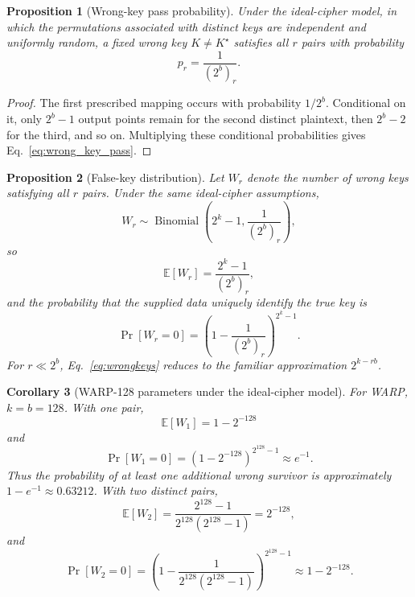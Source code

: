 \documentclass[pdflatex,sn-nature]{sn-jnl}
\newcommand{\E}{\mathbb{E}}
\newcommand{\Prb}{\Pr}
\theoremstyle{thmstyleone}
\newtheorem{proposition}{Proposition}
\newtheorem{corollary}[proposition]{Corollary}
\theoremstyle{thmstyletwo}
\begin{document}
\begin{proposition}[Wrong-key pass probability]
Under the ideal-cipher model, in which the permutations associated with distinct keys are independent and uniformly random, a fixed wrong key $K\neq K^\star$ satisfies all $r$ pairs with probability
\begin{equation}
    p_r=\frac{1}{(2^b)_r}.
    \label{eq:wrong_key_pass}
\end{equation}
\end{proposition}
\begin{proof}
The first prescribed mapping occurs with probability $1/2^b$.  Conditional on it, only $2^b-1$ output points remain for the second distinct plaintext, then $2^b-2$ for the third, and so on.  Multiplying these conditional probabilities gives Eq.~\eqref{eq:wrong_key_pass}.
\end{proof}

\begin{proposition}[False-key distribution]
Let $W_r$ denote the number of wrong keys satisfying all $r$ pairs.  Under the same ideal-cipher assumptions,
\begin{equation}
    W_r\sim\operatorname{Binomial}\!\left(2^k-1,\frac{1}{(2^b)_r}\right),
    \label{eq:falsekey_binomial}
\end{equation}
so
\begin{equation}
    \E[W_r]=\frac{2^k-1}{(2^b)_r},
    \label{eq:wrongkeys}
\end{equation}
and the probability that the supplied data uniquely identify the true key is
\begin{equation}
    \Prb[W_r=0]=
    \left(1-\frac{1}{(2^b)_r}\right)^{2^k-1}.
    \label{eq:unique_key_probability}
\end{equation}
For $r\ll2^b$, Eq.~\eqref{eq:wrongkeys} reduces to the familiar approximation $2^{k-rb}$.
\end{proposition}

\begin{corollary}[WARP-128 parameters under the ideal-cipher model]
For WARP, $k=b=128$.  With one pair,
\begin{equation}
    \E[W_1]=1-2^{-128}
\end{equation}
and
\begin{equation}
    \Prb[W_1=0]=
    \left(1-2^{-128}\right)^{2^{128}-1}\approx e^{-1}.
\end{equation}
Thus the probability of at least one additional wrong survivor is approximately $1-e^{-1}\approx0.63212$.  With two distinct pairs,
\begin{equation}
    \E[W_2]
    =\frac{2^{128}-1}{2^{128}(2^{128}-1)}
    =2^{-128},
\end{equation}
and
\begin{equation}
    \Prb[W_2=0]
    =\left(1-\frac{1}{2^{128}(2^{128}-1)}\right)^{2^{128}-1}
    \approx 1-2^{-128}.
\end{equation}
\end{corollary}
\end{document}
